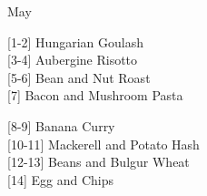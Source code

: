 		\begin{menu}{May}
    
    \begin{recipelist}
    
        {\scriptsize[1-2]} Hungarian Goulash\\
        {\scriptsize[3-4]} Aubergine Risotto\\
        {\scriptsize[5-6]} Bean and Nut Roast\\
        {\scriptsize[7]} Bacon and Mushroom Pasta\\%
    \end{recipelist}%
    \begin{recipelist}
    
        {\scriptsize[8-9]} Banana Curry\\
        {\scriptsize[10-11]} Mackerell and Potato Hash\\
        {\scriptsize[12-13]} Beans and Bulgur Wheat\\
        {\scriptsize[14]} Egg and Chips\\%
    \end{recipelist}\par%
  

\end{menu}
